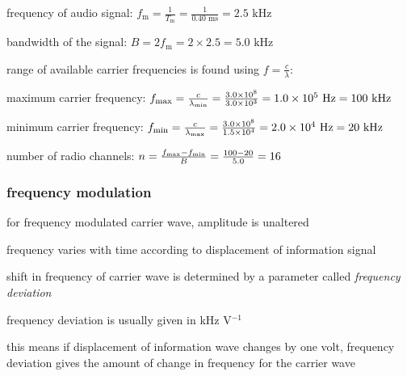 \eqyskip frequency of audio signal: $f_\text{m} = \frac{1}{T_\text{m}} = \frac{1}{0.40 \text{ ms}} = 2.5 \text{ kHz}$
	
bandwidth of the signal: $B = 2 f_\text{m} = 2\times2.5 = 5.0 \text{ kHz}$

range of available carrier frequencies is found using $f=\frac{c}{\lambda}$:

maximum carrier frequency: $f_{\text{max}} = \frac{c}{\lambda_{\text{min}}} = \frac{3.0\times10^8}{3.0\times10^3} = 1.0\times10^5 \text{ Hz} = 100 \text{ kHz}$

minimum carrier frequency: $f_{\text{min}} = \frac{c}{\lambda_{\text{max}}} = \frac{3.0\times10^8}{1.5\times10^4} = 2.0\times10^4 \text{ Hz} = 20 \text{ kHz}$

\eqyskip number of radio channels: $n = \frac{f_{\text{max}} - f_{\text{min}}}{B} = \frac{100-20}{5.0} = 16$ \eoe



\subsubsection{frequency modulation}

for frequency modulated carrier wave, amplitude is unaltered

frequency varies with time according to displacement of information signal

\cmt shift in frequency of carrier wave is determined by a parameter called \emph{frequency deviation}

frequency deviation is usually given in kHz V$^{-1}$

this means if displacement of information wave changes by one volt, frequency deviation gives the amount of change in frequency for the carrier wave

